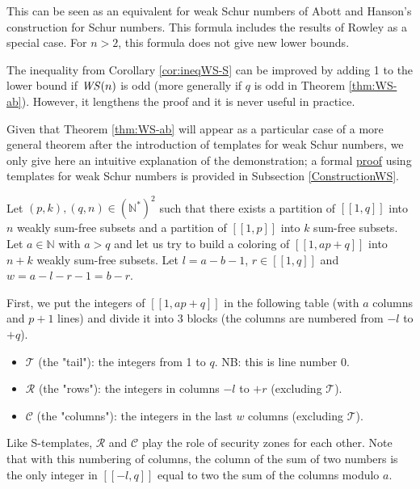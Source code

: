 This can be seen as an equivalent for weak Schur numbers of Abott and Hanson's construction for Schur numbers. This formula includes
the results of Rowley \cite{RowleyWS} as a special case. For \(n>2\), this formula does not give new lower bounds.

\begin{remark}
The inequality from Corollary \ref{cor:ineqWS-S} can be improved by adding 1 to the lower bound if \(\mathit{WS} (n)\) is odd (more generally if \(q\) is
odd in Theorem \ref{thm:WS-ab}). However, it lengthens the proof and it is never useful in practice.
\end{remark}

Given that Theorem \ref{thm:WS-ab} will appear as a particular case of a more general theorem after the introduction of
templates for weak Schur numbers, we only give here an intuitive explanation of the demonstration; a formal
\hyperref[PreuveThm]{proof} using templates for weak Schur numbers is provided in Subsection \ref{ConstructionWS}.

Let \((p, k), (q, n) \in (\mathbb{N}^*)^2\) such that there exists a partition of \([\![1,q]\!]\) into \(n\) weakly sum-free
subsets and a partition of \([\![1,p]\!]\) into \(k\) sum-free subsets. Let \(a \in \mathbb{N}\) with \(a > q\)
and let us try to build a coloring of \([\![1, ap + q]\!]\) into \(n + k\) weakly sum-free subsets. Let
\(l = a - b - 1\), \(r \in [\![1,q]\!]\) and \(w = a - l - r - 1 = b - r\).

First, we put the integers of \([\![1, ap + q]\!]\) in the following table (with \(a\) columns and \(p + 1\) lines)
and divide it into 3 blocks (the columns are numbered from \(-l\) to \(+q\)).

\begin{itemize}
	\item \(\mathcal{T}\) (the "tail"): the integers from 1 to \(q\). NB: this is line number 0.
	\item \(\mathcal{R}\) (the "rows"): the integers in columns \(-l\) to \(+r\) (excluding  \(\mathcal{T}\)).
	\item \(\mathcal{C}\) (the "columns"): the integers in the last \(w\) columns (excluding  \(\mathcal{T}\)).
\end{itemize}

Like S-templates, \(\mathcal{R}\) and \(\mathcal{C}\) play the role of security zones for each other. Note that with
this numbering of columns, the column of the sum of two numbers is the only integer in \([\![-l,q]\!]\) equal to two the
sum of the columns modulo \(a\).

